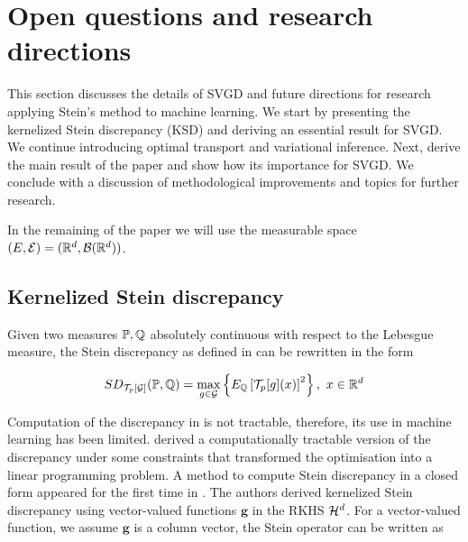 

\section{Open questions and research directions}\label{rest}
This section discusses the details of SVGD \cite{liu2016stein} and future directions for research applying Stein's method to machine learning. We start by presenting the kernelized Stein discrepancy (KSD) and deriving an essential result for SVGD. We continue introducing optimal transport and variational inference. Next, derive the main result of the paper and show how its importance for SVGD. We conclude with a discussion of methodological improvements and topics for further research.

\noindent In the remaining of the paper we will use the measurable space $(E, \mathcal{E}) = (\mathbb{R}^d, \mathcal{B}(\mathbb{R}^d))$. 

\subsection{Kernelized Stein discrepancy}\label{KSD}
Given two measures $\mathbb{P}, \mathbb{Q}$ absolutely continuous with respect to the Lebesgue measure, the Stein discrepancy as defined in  can be rewritten in the form

\begin{equation}\label{stein_discrepancy_2}
SD_{\mathcal{T}_p[\mathcal{G}]}(\mathbb{P}, \mathbb{Q}) = \max_{g \in \mathcal{G}}\left\{E_{\mathbb{Q}}\left[\mathcal{T}_{p}[g](x)\right]^2\right \}, \ x \in \mathbb{R}^d
\end{equation}

Computation of the discrepancy in  is not tractable, therefore, its use in machine learning has been limited. \cite{gorham2015measuring} derived a computationally tractable version of the discrepancy under some constraints that transformed the optimisation into a linear programming problem. A method to compute Stein discrepancy in a closed form appeared for the first time in \cite{liu2016kernelized}. The authors derived kernelized Stein discrepancy using vector-valued functions $\boldsymbol{g}$ in the RKHS $\mathcal{H}^d$. For a vector-valued function, we assume $\boldsymbol{g}$ is a column vector, the Stein operator can be written as

